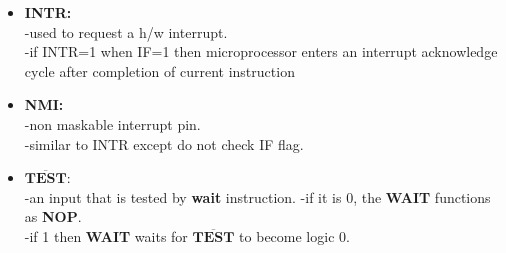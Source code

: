 \documentclass[12pt]{article}
\begin{document}
\begin{itemize}
\begin{itemize}
		\item\textbf{INTR:}\\
		-used to request a h/w interrupt.\\
		-if INTR=1 when IF=1 then microprocessor enters an interrupt acknowledge cycle after completion of current instruction\\
		
		\item\textbf{NMI:}\\
		-non maskable interrupt pin.\\
		-similar to INTR except do not check IF flag.\\
		
		\item$\overline{\textbf{TEST}}:$\\
		-an input that is tested by \textbf{wait} instruction.
		-if it is 0, the \textbf{WAIT} functions as \textbf{NOP}.\\
		-if 1 then \textbf{WAIT} waits for   $\overline{\textbf{TEST}}$ to become logic 0.\\
	\end{itemize}
\end{itemize}

\newpage

\end{document}
